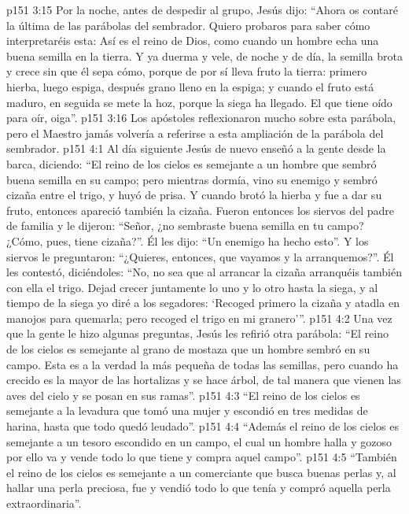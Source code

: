 \vs p151 3:15 Por la noche, antes de despedir al grupo, Jesús dijo: “Ahora os contaré la última de las parábolas del sembrador. Quiero probaros para saber cómo interpretaréis esta: Así es el reino de Dios, como cuando un hombre echa una buena semilla en la tierra. Y ya duerma y vele, de noche y de día, la semilla brota y crece sin que él sepa cómo, porque de por sí lleva fruto la tierra: primero hierba, luego espiga, después grano lleno en la espiga; y cuando el fruto está maduro, en seguida se mete la hoz, porque la siega ha llegado. El que tiene oído para oír, oiga”.
\vs p151 3:16 Los apóstoles reflexionaron mucho sobre esta parábola, pero el Maestro jamás volvería a referirse a esta ampliación de la parábola del sembrador.
\vs p151 4:1 Al día siguiente Jesús de nuevo enseñó a la gente desde la barca, diciendo: “El reino de los cielos es semejante a un hombre que sembró buena semilla en su campo; pero mientras dormía, vino su enemigo y sembró cizaña entre el trigo, y huyó de prisa. Y cuando brotó la hierba y fue a dar su fruto, entonces apareció también la cizaña. Fueron entonces los siervos del padre de familia y le dijeron: “Señor, ¿no sembraste buena semilla en tu campo? ¿Cómo, pues, tiene cizaña?”. Él les dijo: “Un enemigo ha hecho esto”. Y los siervos le preguntaron: “¿Quieres, entonces, que vayamos y la arranquemos?”. Él les contestó, diciéndoles: “No, no sea que al arrancar la cizaña arranquéis también con ella el trigo. Dejad crecer juntamente lo uno y lo otro hasta la siega, y al tiempo de la siega yo diré a los segadores: ‘Recoged primero la cizaña y atadla en manojos para quemarla; pero recoged el trigo en mi granero’”.
\vs p151 4:2 \pc Una vez que la gente le hizo algunas preguntas, Jesús les refirió otra parábola: “El reino de los cielos es semejante al grano de mostaza que un hombre sembró en su campo. Esta es a la verdad la más pequeña de todas las semillas, pero cuando ha crecido es la mayor de las hortalizas y se hace árbol, de tal manera que vienen las aves del cielo y se posan en sus ramas”.
\vs p151 4:3 \pc “El reino de los cielos es semejante a la levadura que tomó una mujer y escondió en tres medidas de harina, hasta que todo quedó leudado”.
\vs p151 4:4 \pc “Además el reino de los cielos es semejante a un tesoro escondido en un campo, el cual un hombre halla y gozoso por ello va y vende todo lo que tiene y compra aquel campo”.
\vs p151 4:5 \pc “También el reino de los cielos es semejante a un comerciante que busca buenas perlas y, al hallar una perla preciosa, fue y vendió todo lo que tenía y compró aquella perla extraordinaria”.
